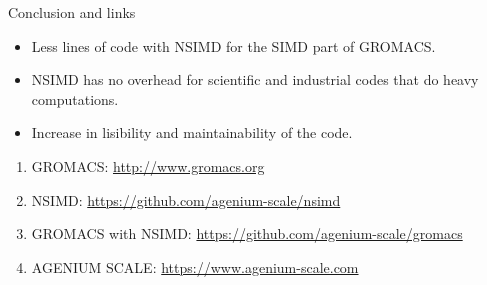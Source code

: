 \documentclass[shrink, compress, mathserif, 10pt, xcolor=dvipsnames,
               aspectratio=169]{beamer}
\begin{document}
\begin{frame}{Conclusion and links}
  \begin{itemize}
    \item
      Less lines of code with NSIMD for the SIMD part of GROMACS.
    \item
      NSIMD has no overhead for scientific and industrial codes that do
      heavy computations.
    \item
      Increase in lisibility and maintainability of the code.
  \end{itemize}

  \vspace{2em}
  \begin{enumerate}
    \item GROMACS: \url{http://www.gromacs.org}
    \item NSIMD: \url{https://github.com/agenium-scale/nsimd}
    \item GROMACS with NSIMD: \url{https://github.com/agenium-scale/gromacs}
    \item AGENIUM SCALE: \url{https://www.agenium-scale.com}
  \end{enumerate}
\end{frame}
\end{document}
